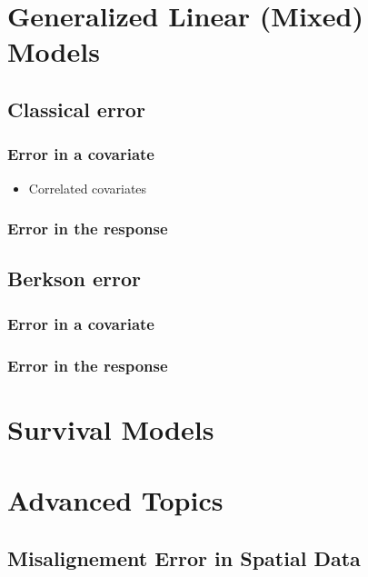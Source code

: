 \documentclass[]{book}
\providecommand{\tightlist}{%
  \setlength{\itemsep}{0pt}\setlength{\parskip}{0pt}}
\theoremstyle{definition}
\theoremstyle{definition}
\theoremstyle{definition}
\theoremstyle{remark}
\begin{document}
\chapter{Generalized Linear (Mixed) Models}\label{GLMMs}

\section{Classical error}\label{classical-error}

\subsection{Error in a covariate}\label{error-in-a-covariate}

\begin{itemize}
\tightlist
\item
  Correlated covariates
\end{itemize}

\subsection{Error in the response}\label{error-in-the-response-1}

\section{Berkson error}\label{berkson-error}

\subsection{Error in a covariate}\label{error-in-a-covariate-1}

\subsection{Error in the response}\label{error-in-the-response-2}

\chapter{Survival Models}\label{Survival}

\chapter{Advanced Topics}\label{advancedTopics}

\section{Misalignement Error in Spatial
Data}\label{misalignement-error-in-spatial-data}


\end{document}

